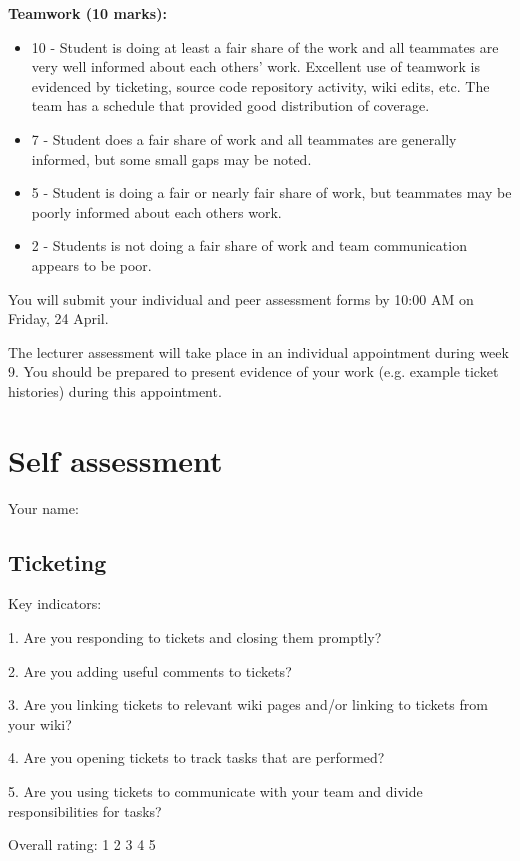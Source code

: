 \documentclass{article}   	%
\begin{document}
\textbf{Teamwork (10 marks):}
\begin{itemize}
  \item 10 - Student is doing at least a fair share of the work and all teammates are very well informed about each others' work.  Excellent use of teamwork is evidenced by ticketing, source code repository activity, wiki edits, etc.  The team has a schedule that provided good distribution of coverage.
  \item 7 -  Student does a fair share of work and all teammates are generally informed, but some small gaps may be noted.
  \item 5 -  Student is doing a fair or nearly fair share of work, but teammates may be poorly informed about each others work.
  \item 2 -  Students is not doing a fair share of work and team communication appears to be poor.
\end{itemize}

You will submit your individual and peer assessment forms by 10:00 AM on Friday, 24 April.

The lecturer assessment will take place in an individual appointment during week 9.  You should be prepared to present evidence of your work (e.g. example ticket histories) during this appointment.

\newpage

\section*{Self assessment}

Your name: 
\vskip 1cm

\subsection*{Ticketing}

Key indicators: 

1.  Are you responding to tickets and closing them promptly?

2.  Are you adding useful comments to tickets?

3.  Are you linking tickets to relevant wiki pages and/or linking to tickets from your wiki?

4.  Are you opening tickets to track tasks that are performed?

5.  Are you using tickets to communicate with your team and divide responsibilities for tasks?

Overall rating: \hskip 1cm 1 \hskip 1cm 2 \hskip 1cm 3 \hskip 1cm 4 \hskip 1cm 5 
\end{document}
